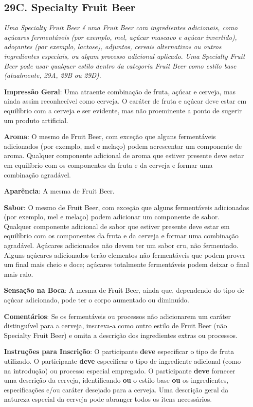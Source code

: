 \subsection*{29C. Specialty Fruit Beer}
\textit{Uma Specialty Fruit Beer é uma Fruit Beer com ingredientes adicionais, como açúcares fermentáveis (por exemplo, mel, açúcar mascavo e açúcar invertido), adoçantes (por exemplo, lactose), adjuntos, cereais alternativos ou outros ingredientes especiais, ou algum processo adicional aplicado. Uma Specialty Fruit Beer pode usar qualquer estilo dentro da categoria Fruit Beer como estilo base (atualmente, 29A, 29B ou 29D).}

\textbf{Impressão Geral}: Uma atraente combinação de fruta, açúcar e cerveja, mas ainda assim reconhecível como cerveja. O caráter de fruta e açúcar deve estar em equilíbrio com a cerveja e ser evidente, mas não proeminente a ponto de sugerir um produto artificial.

\textbf{Aroma}: O mesmo de Fruit Beer, com exceção que alguns fermentáveis adicionados (por exemplo, mel e melaço) podem acrescentar um componente de aroma. Qualquer componente adicional de aroma que estiver presente deve estar em equilíbrio com os componentes da fruta e da cerveja e formar uma combinação agradável.

\textbf{Aparência}: A mesma de Fruit Beer.

\textbf{Sabor}: O mesmo de Fruit Beer, com exceção que alguns fermentáveis adicionados (por exemplo, mel e melaço) podem adicionar um componente de sabor. Qualquer componente adicional de sabor que estiver presente deve estar em equilíbrio com os componentes da fruta e da cerveja e formar uma combinação agradável. Açúcares adicionados não devem ter um sabor cru, não fermentado. Alguns açúcares adicionados terão elementos não fermentáveis que podem prover um final mais cheio e doce; açúcares totalmente fermentáveis podem deixar o final mais ralo.

\textbf{Sensação na Boca}: A mesma de Fruit Beer, ainda que, dependendo do tipo de açúcar adicionado, pode ter o corpo aumentado ou diminuído.

\textbf{Comentários}: Se os fermentáveis ou processos não adicionarem um caráter distinguível para a cerveja, inscreva-a como outro estilo de Fruit Beer (não Specialty Fruit Beer) e omita a descrição dos ingredientes extras ou processos.

\textbf{Instruções para Inscrição}: O participante \textbf{deve} especificar o tipo de fruta utilizado. O participante \textbf{deve} especificar o tipo de ingrediente adicional (como na introdução) ou processo especial empregado. O participante \textbf{deve} fornecer uma descrição da cerveja, identificando \textbf{ou} o estilo base \textbf{ou} os ingredientes, especificações e/ou caráter desejado para a cerveja. Uma descrição geral da natureza especial da cerveja pode abranger todos os itens necessários.

